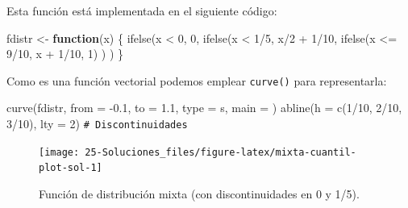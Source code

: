 \documentclass[
]{book}
\newenvironment{Shaded}{\begin{snugshade}}{\end{snugshade}}
\newcommand{\AttributeTok}[1]{\textcolor[rgb]{0.77,0.63,0.00}{#1}}
\newcommand{\CommentTok}[1]{\textcolor[rgb]{0.56,0.35,0.01}{\textit{#1}}}
\newcommand{\ControlFlowTok}[1]{\textcolor[rgb]{0.13,0.29,0.53}{\textbf{#1}}}
\newcommand{\DecValTok}[1]{\textcolor[rgb]{0.00,0.00,0.81}{#1}}
\newcommand{\FloatTok}[1]{\textcolor[rgb]{0.00,0.00,0.81}{#1}}
\newcommand{\FunctionTok}[1]{\textcolor[rgb]{0.00,0.00,0.00}{#1}}
\newcommand{\NormalTok}[1]{#1}
\newcommand{\OtherTok}[1]{\textcolor[rgb]{0.56,0.35,0.01}{#1}}
\newcommand{\SpecialCharTok}[1]{\textcolor[rgb]{0.00,0.00,0.00}{#1}}
\newcommand{\StringTok}[1]{\textcolor[rgb]{0.31,0.60,0.02}{#1}}
\theoremstyle{break}
\theoremstyle{nonumberplain}
\renewcommand{\CommentTok}[1]{\textcolor[rgb]{0.41,0.41,0.41}{\texttt{#1}}}
\begin{document}
Esta función está implementada en el siguiente código:

\begin{Shaded}
\begin{Highlighting}[]
\NormalTok{fdistr }\OtherTok{\textless{}{-}} \ControlFlowTok{function}\NormalTok{(x) \{}
\FunctionTok{ifelse}\NormalTok{(x }\SpecialCharTok{\textless{}} \DecValTok{0}\NormalTok{, }\DecValTok{0}\NormalTok{,}
    \FunctionTok{ifelse}\NormalTok{(x }\SpecialCharTok{\textless{}} \DecValTok{1}\SpecialCharTok{/}\DecValTok{5}\NormalTok{, x}\SpecialCharTok{/}\DecValTok{2} \SpecialCharTok{+} \DecValTok{1}\SpecialCharTok{/}\DecValTok{10}\NormalTok{,}
        \FunctionTok{ifelse}\NormalTok{(x }\SpecialCharTok{\textless{}=} \DecValTok{9}\SpecialCharTok{/}\DecValTok{10}\NormalTok{, x }\SpecialCharTok{+} \DecValTok{1}\SpecialCharTok{/}\DecValTok{10}\NormalTok{, }\DecValTok{1}\NormalTok{) ) )}
\NormalTok{\}}
\end{Highlighting}
\end{Shaded}

Como es una función vectorial podemos emplear \texttt{curve()} para representarla:

\begin{Shaded}
\begin{Highlighting}[]
\FunctionTok{curve}\NormalTok{(fdistr, }\AttributeTok{from =} \SpecialCharTok{{-}}\FloatTok{0.1}\NormalTok{, }\AttributeTok{to =} \FloatTok{1.1}\NormalTok{, }\AttributeTok{type =} \StringTok{\textquotesingle{}s\textquotesingle{}}\NormalTok{, }\AttributeTok{main =} \StringTok{\textquotesingle{}\textquotesingle{}}\NormalTok{)}
\FunctionTok{abline}\NormalTok{(}\AttributeTok{h =} \FunctionTok{c}\NormalTok{(}\DecValTok{1}\SpecialCharTok{/}\DecValTok{10}\NormalTok{, }\DecValTok{2}\SpecialCharTok{/}\DecValTok{10}\NormalTok{, }\DecValTok{3}\SpecialCharTok{/}\DecValTok{10}\NormalTok{), }\AttributeTok{lty =} \DecValTok{2}\NormalTok{) }\CommentTok{\# Discontinuidades}
\end{Highlighting}
\end{Shaded}

\begin{figure}[!htb]

{\centering \texttt{[image: 25-Soluciones\_files/figure-latex/mixta-cuantil-plot-sol-1]} 

}

\caption{Función de distribución mixta (con discontinuidades en 0 y 1/5).}\label{fig:mixta-cuantil-plot-sol}
\end{figure}
\end{document}
